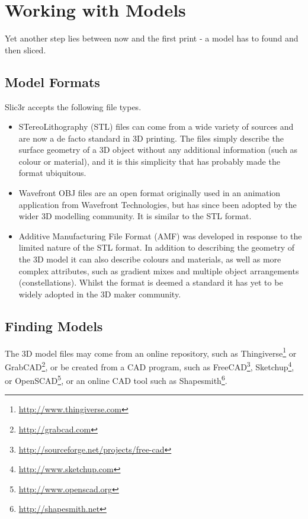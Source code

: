 \section{Working with Models}
\label{sub:working_with_models}

Yet another step lies between now and the first print - a model has to found and then sliced.

\subsection{Model Formats} %
\label{sub:model_formats}

Slic3r accepts the following file types.

\begin{itemize}
	\item STereoLithography (STL) files can come from a wide variety of sources and are now a de facto standard in 3D printing.  The files simply describe the surface geometry of a 3D object without any additional information (such as colour or material), and it is this simplicity that has probably made the format ubiquitous.
	\item Wavefront OBJ files are an open format originally used in an animation application from Wavefront Technologies, but has since been adopted by the wider 3D modelling community.  It is similar to the STL format.
	\item Additive Manufacturing File Format (AMF) was developed in response to the limited nature of the STL format.  In addition to describing the geometry of the 3D model it can also describe colours and materials, as well as more complex attributes, such as gradient mixes and multiple object arrangements (constellations).  Whilst the format is deemed a standard it has yet to be widely adopted in the 3D maker community.
\end{itemize}

\subsection{Finding Models} %
\label{sub:finding_models}

The 3D model files may come from an online repository, such as Thingiverse\footnote{\url{http://www.thingiverse.com}} or GrabCAD\footnote{\url{http://grabcad.com}}, or be created from a CAD program, such as FreeCAD\footnote{\url{http://sourceforge.net/projects/free-cad}}, Sketchup\footnote{\url{http://www.sketchup.com}}, or OpenSCAD\footnote{\url{http://www.openscad.org}}, or an online CAD tool such as Shapesmith\footnote{\url{http://shapesmith.net}}.

